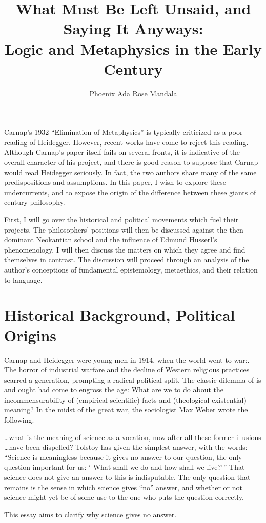 \documentclass[leqno, 12pt]{turabian-researchpaper}
\title{What Must Be Left Unsaid, and Saying It Anyways: \\ Logic and Metaphysics
in the Early \nth{20} Century}
\author{Phoenix Ada Rose Mandala}
\begin{document}
	\maketitle

	Carnap's 1932 \enquote{Elimination of Metaphysics} \nocite{carnap1966} is
	typically criticized as a poor reading of Heidegger. However, recent works
	have come to reject this reading. Although Carnap's paper itself fails on several
	fronts, it is indicative of the overall character of his project, and there is
	good reason to suppose that Carnap would read Heidegger seriously. In fact, the
	two authors share many of the same predispositions and assumptions. In this
	paper, I wish to explore these undercurrents, and to expose the origin of the
	difference between these giants of  century philosophy.

	First, I will go over the historical and political movements which fuel their
	projects. The philosophers' positions will then be discussed against the then-dominant
	Neokantian school and the influence of Edmund Husserl's phenomenology. I will then
	discuss the matters on which they agree and find themselves in contrast. The
	discussion will proceed through an analysis of the author's conceptions of
	fundamental epistemology, metaethics, and their relation to language.

	\section{Historical Background, Political Origins}

	Carnap and Heidegger were young men in 1914, when the world went to war:. The
	horror of industrial warfare and the decline of Western religious practices
	scarred a generation, prompting a radical political split. The classic dilemma
	of is and ought had come to engross the age: What are we to do about the incommensurability
	of (empirical-scientific) facts and (theological-existential) meaning? In the
	midst of the great war, the sociologist Max Weber wrote the following.

	\begin{displayquote}
		 \dots what is the meaning of science as a vocation,
		now after all these former illusions \dots have been dispelled? Tolstoy has given
		the simplest answer, with the words: \enquote{Science is meaningless because it gives %
		no answer to our question, the only question important for us: \enquote{%
		What shall we do and how shall we live?}}
		That science does not give an answer to this is indisputable. The only question
		that remains is the sense in which science gives \enquote{no} answer, and whether
		or not science might yet be of some use to the one who puts the question correctly.
	\end{displayquote}
	This essay aims to clarify why science gives no answer.
\end{document}
